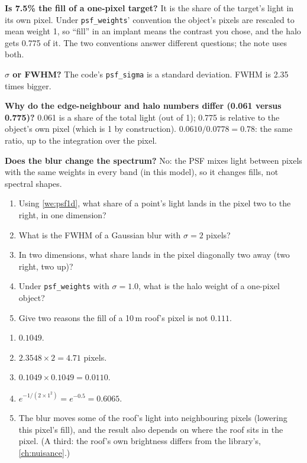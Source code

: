 \documentclass[11pt,a4paper,oneside,openany]{book}
\begin{document}
\begin{confusions}
\textbf{Is 7.5\% the fill of a one-pixel target?} It is the share of the target's light in its own pixel. Under
\texttt{psf\_weights}' convention the object's pixels are rescaled to mean weight 1, so ``fill'' in an implant means the contrast you
chose, and the halo gets 0.775 of it. The two conventions answer different questions; the note uses both.

\textbf{$\sigma$ or FWHM?} The code's \texttt{psf\_sigma} is a standard deviation. FWHM is 2.35 times bigger.

\textbf{Why do the edge-neighbour and halo numbers differ (0.061 versus 0.775)?} 0.061 is a share of the total light (out of 1);
0.775 is relative to the object's own pixel (which is 1 by construction). $0.0610/0.0778=0.78$: the same ratio, up to the
integration over the pixel.

\textbf{Does the blur change the spectrum?} No: the PSF mixes light between pixels with the same weights in every band (in this
model), so it changes fills, not spectral shapes.
\end{confusions}

\begin{checkyourself}
\begin{enumerate}
\item Using \cref{we:psf1d}, what share of a point's light lands in the pixel two to the right, in one dimension?
\item What is the FWHM of a Gaussian blur with $\sigma=2$ pixels?
\item In two dimensions, what share lands in the pixel diagonally two away (two right, two up)?
\item Under \texttt{psf\_weights} with $\sigma=1.0$, what is the halo weight of a one-pixel object?
\item Give two reasons the fill of a 10\,m roof's pixel is not $0.111$.
\end{enumerate}
\end{checkyourself}

\begin{answers}
\begin{enumerate}
\item $0.1049$.
\item $2.3548\times2=4.71$ pixels.
\item $0.1049\times0.1049=0.0110$.
\item $e^{-1/(2\times1^2)}=e^{-0.5}=0.6065$.
\item The blur moves some of the roof's light into neighbouring pixels (lowering this pixel's fill), and the result also depends on
  where the roof sits in the pixel. (A third: the roof's own brightness differs from the library's, \cref{ch:nuisance}.)
\end{enumerate}
\end{answers}
\end{document}
